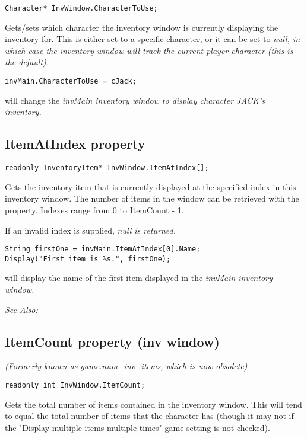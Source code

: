 \begin{verbatim}
Character* InvWindow.CharacterToUse;
\end{verbatim}
Gets/sets which character the inventory window is currently displaying the inventory
for. This is either set to a specific character, or it can be set to \it{null}, in which
case the inventory window will track the current player character (this is the default).

\begin{verbatim}
invMain.CharacterToUse = cJack;
\end{verbatim}
will change the \it{invMain} inventory window to display character JACK's inventory.


\subsection{ItemAtIndex property}\label{InvWindow.ItemAtIndex}%

\begin{verbatim}
readonly InventoryItem* InvWindow.ItemAtIndex[];
\end{verbatim}
Gets the inventory item that is currently displayed at the specified index in this
inventory window. The number of items in the window can be retrieved with the
 property. Indexes range from 0 to ItemCount - 1.

If an invalid index is supplied, \it{null} is returned.

\begin{verbatim}
String firstOne = invMain.ItemAtIndex[0].Name;
Display("First item is %s.", firstOne);
\end{verbatim}
will display the name of the first item displayed in the \it{invMain} inventory window.

\it{See Also:} 


\subsection{ItemCount property (inv window)}\label{InvWindow.ItemCount}%

\it{(Formerly known as game.num_inv_items, which is now obsolete)}

\begin{verbatim}
readonly int InvWindow.ItemCount;
\end{verbatim}
Gets the total number of items contained in the inventory window. This will tend
to equal the total number of items that the character has (though it may not if
the "Display multiple items multiple times" game setting is not checked).

